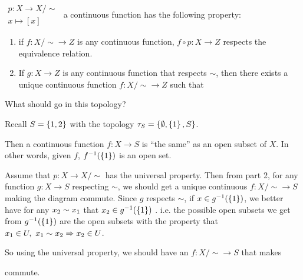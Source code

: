 \documentclass[12pt, twosided]{article}
\begin{document}
\begin{thm}
  \(
  \begin{matrix}
    p: X \to X /\sim \\ x \mapsto [x]
  \end{matrix}
  \) {\color{red} a continuous function} has the following property:
  \begin{enumerate}
  \item if \(f: X/\sim \to Z\) is any {\color{red} continuous} function, \(f \circ p: X \to Z\) respects the equivalence relation.
  \item If \(g: X \to Z\) is any {\color{red} continuous} function that respects \(\sim\), then there exists a unique {\color{red} continuous} function \(f: X/\sim \to Z\) such that

    \begin{center}
    \end{center}
  \end{enumerate}
\end{thm}

What should go in this topology?

Recall \(S = \left\{ 1, 2 \right\}\) with the topology \(\tau_S = \left\{ \emptyset, \left\{ 1 \right\}, S \right\}\).

Then a continuous function \(f : X \to S\) is ``the same'' as an open subset of \(X\). In other words, given \(f\), \(f^{-1}(\left\{ 1\right\})\) is an open set.

Assume that \(p: X \to X/\sim\) has the universal property. Then from part 2, for any function \(g: X \to S\) respecting \(\sim\), we should get a unique continuous \(f: X/\sim \to S\) making the diagram commute. Since \(g\) respects \(\sim\), if \(x \in g^{-1}(\left\{ 1 \right\})\), we better have for any \(x_2 \sim x\sb1\) that \(x\sb2 \in g^{-1}(\left\{ 1 \right\})\) .
i.e. the possible open subsets we get from \(g^{-1}(\left\{ 1 \right\})\) are the open subsets with the property that \(x\sb1 \in U,\ x_1 \sim x_2 \Rightarrow x_2 \in U\).

So using the universal property, we should have an \(f: X/\sim \to S\) that makes  commute.
\end{document}
